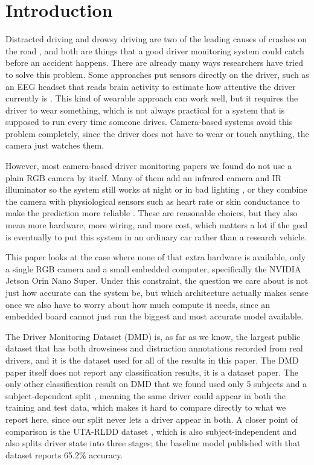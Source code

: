\documentclass[conference]{IEEEtran}
\begin{document}
\section{Introduction}

Distracted driving and drowsy driving are two of the leading causes of crashes on the road \cite{b_cdc}, and both are things that a good driver monitoring system could catch before an accident happens. There are already many ways researchers have tried to solve this problem. Some approaches put sensors directly on the driver, such as an EEG headset that reads brain activity to estimate how attentive the driver currently is \cite{b_wearable}. This kind of wearable approach can work well, but it requires the driver to wear something, which is not always practical for a system that is supposed to run every time someone drives. Camera-based systems avoid this problem completely, since the driver does not have to wear or touch anything, the camera just watches them.

However, most camera-based driver monitoring papers we found do not use a plain RGB camera by itself. Many of them add an infrared camera and IR illuminator so the system still works at night or in bad lighting \cite{b_riskaware}, or they combine the camera with physiological sensors such as heart rate or skin conductance to make the prediction more reliable \cite{b_riskaware}. These are reasonable choices, but they also mean more hardware, more wiring, and more cost, which matters a lot if the goal is eventually to put this system in an ordinary car rather than a research vehicle.

This paper looks at the case where none of that extra hardware is available, only a single RGB camera and a small embedded computer, specifically the NVIDIA Jetson Orin Nano Super. Under this constraint, the question we care about is not just how accurate can the system be, but which architecture actually makes sense once we also have to worry about how much compute it needs, since an embedded board cannot just run the biggest and most accurate model available.

The Driver Monitoring Dataset (DMD) \cite{b_dmd} is, as far as we know, the largest public dataset that has both drowsiness and distraction annotations recorded from real drivers, and it is the dataset used for all of the results in this paper. The DMD paper itself does not report any classification results, it is a dataset paper. The only other classification result on DMD that we found used only 5 subjects and a subject-dependent split \cite{b_dmd_canas}, meaning the same driver could appear in both the training and test data, which makes it hard to compare directly to what we report here, since our split never lets a driver appear in both. A closer point of comparison is the UTA-RLDD dataset \cite{b_utarldd}, which is also subject-independent and also splits driver state into three stages; the baseline model published with that dataset reports 65.2\% accuracy.
\end{document}
